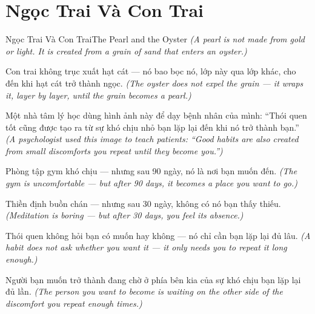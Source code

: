 \section{Ngọc Trai Và Con Trai}
\begin{truyen}{Ngọc Trai Và Con Trai}{The Pearl and the Oyster}
\textit{(A pearl is not made from gold or light. It is created from a grain of sand that enters an oyster.)}

Con trai không trục xuất hạt cát — nó bao bọc nó, lớp này qua lớp khác, cho đến khi hạt cát trở thành ngọc.
\textit{(The oyster does not expel the grain — it wraps it, layer by layer, until the grain becomes a pearl.)}

Một nhà tâm lý học dùng hình ảnh này để dạy bệnh nhân của mình: ``Thói quen tốt cũng được tạo ra từ sự khó chịu nhỏ bạn lặp lại đến khi nó trở thành bạn.''
\textit{(A psychologist used this image to teach patients: ``Good habits are also created from small discomforts you repeat until they become you.'')}

Phòng tập gym khó chịu — nhưng sau 90 ngày, nó là nơi bạn muốn đến.
\textit{(The gym is uncomfortable — but after 90 days, it becomes a place you want to go.)}

Thiền định buồn chán — nhưng sau 30 ngày, không có nó bạn thấy thiếu.
\textit{(Meditation is boring — but after 30 days, you feel its absence.)}

Thói quen không hỏi bạn có muốn hay không — nó chỉ cần bạn lặp lại đủ lâu.
\textit{(A habit does not ask whether you want it — it only needs you to repeat it long enough.)}

\end{truyen}

\begin{baihoc}
Người bạn muốn trở thành đang chờ ở phía bên kia của sự khó chịu bạn lặp lại đủ lần.
\textit{(The person you want to become is waiting on the other side of the discomfort you repeat enough times.)}
\end{baihoc}
\ngancach


